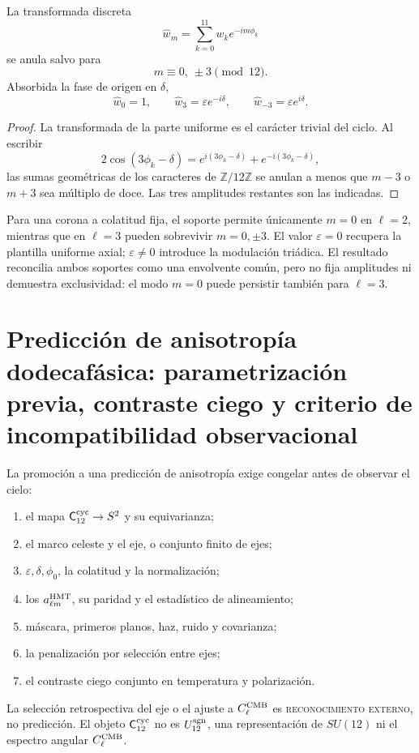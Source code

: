 \begin{theorem}
\label{thm:soporte-fourier-dodecafasico}
La transformada discreta
\[
 \widehat w_m=\sum_{k=0}^{11}w_ke^{-im\phi_k}
\]
se anula salvo para
\[
 m\equiv0,\ \pm3\pmod{12}.
\]
Absorbida la fase de origen en \(\delta\),
\[
 \widehat w_0=1,\qquad
 \widehat w_3=\varepsilon e^{-i\delta},\qquad
 \widehat w_{-3}=\varepsilon e^{i\delta}.
\]
\end{theorem}

\begin{proof}
La transformada de la parte uniforme es el carácter trivial del ciclo. Al
escribir
\[
 2\cos(3\phi_k-\delta)
 =e^{i(3\phi_k-\delta)}+e^{-i(3\phi_k-\delta)},
\]
las sumas geométricas de los caracteres de \(\mathbb Z/12\mathbb Z\) se
anulan a menos que \(m-3\) o \(m+3\) sea múltiplo de doce. Las tres
amplitudes restantes son las indicadas.
\end{proof}

Para una corona a colatitud fija, el soporte permite únicamente \(m=0\) en
\(\ell=2\), mientras que en \(\ell=3\) pueden sobrevivir
\(m=0,\pm3\). El valor \(\varepsilon=0\) recupera la plantilla uniforme
axial; \(\varepsilon\neq0\) introduce la modulación triádica. El resultado
reconcilia ambos soportes como una envolvente común, pero no fija amplitudes
ni demuestra exclusividad: el modo \(m=0\) puede persistir también para
\(\ell=3\).

\section{Predicción de anisotropía dodecafásica: parametrización previa, contraste ciego y criterio de incompatibilidad observacional}
\label{sec:interfaz-cosmologica-c12}

La promoción a una predicción de anisotropía exige congelar antes de observar
el cielo:
\begin{enumerate}
 \item el mapa \(\mathsf C_{12}^{\rm cyc}\to S^2\) y su equivarianza;
 \item el marco celeste y el eje, o conjunto finito de ejes;
 \item \(\varepsilon,\delta,\phi_0\), la colatitud y la normalización;
 \item los \(a_{\ell m}^{\rm HMT}\), su paridad y el estadístico de
 alineamiento;
 \item máscara, primeros planos, haz, ruido y covarianza;
 \item la penalización por selección entre ejes;
 \item el contraste ciego conjunto en temperatura y polarización.
\end{enumerate}
La selección retrospectiva del eje o el ajuste a \(C_\ell^{\rm CMB}\) es
\textsc{reconocimiento externo}, no predicción. El objeto
\(\mathsf C_{12}^{\rm cyc}\) no es \(U_{12}^{\rm sgn}\), una
representación de \(SU(12)\) ni el espectro angular
\(C_\ell^{\rm CMB}\).

